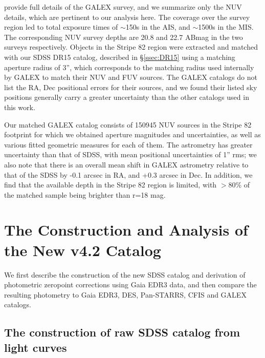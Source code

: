 \documentclass[fleqn,usenatbib]{mnras}
\begin{document}
\citet{2017ApJS..230...24B} provide full details of the GALEX survey, and we summarize only the NUV details, which are pertinent to our analysis here. The coverage over the survey region led to total exposure times of $\sim$150s in the AIS, and $\sim$1500s in the MIS. The corresponding NUV survey depths are 20.8 and 22.7 ABmag in the two surveys respectively. Objects in the Stripe 82 region were extracted and matched with our SDSS DR15 catalog, described in \S \ref{ssec:DR15} using a matching aperture radius of 3'', which corresponds to the matching radius used internally by GALEX to match their NUV and FUV sources. The GALEX catalogs do not list the RA, Dec positional errors for their sources, and we found their listed sky positions generally carry a greater uncertainty than the other catalogs used in this work.

Our matched GALEX catalog consists of 150945 NUV sources in the Stripe 82 footprint for which we obtained aperture magnitudes and uncertainties, as well as various fitted geometric measures for each of them. The astrometry has greater uncertainty than that of SDSS, with mean positional uncertainties of 1'' rms; we also note that there is an overall mean shift in GALEX astrometry relative to that of the SDSS by -0.1 arcsec in RA, and +0.3 arcsec in Dec. In addition, we find that the available depth in the Stripe 82 region is limited, with $>$80\% of the matched sample being brighter than r=18 mag. 
  
 
\section{The Construction and Analysis of the New v4.2 Catalog \label{sec:v42}}

We first describe the construction of the new SDSS catalog and derivation of photometric
zeropoint corrections using Gaia EDR3 data, and then compare the resulting photometry to 
Gaia EDR3, DES, Pan-STARRS, CFIS and GALEX catalogs. 


\subsection{The construction of raw SDSS catalog from light curves \label{sec:averaging}} 
\end{document}

